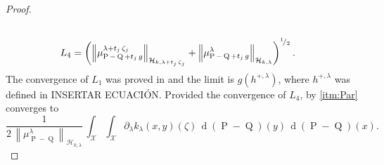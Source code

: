 \begin{proof}
\begin{equation}
\begin{aligned}
					\\
					L_{4}&=\left(\left\|\mu_{\operatorname{P}-\operatorname{Q}+t_{j}\,g}^{\lambda+t_{j}\,\zeta_{j}}\right\|_{\mathcal{H}_{k,\lambda+t_{j}\,\zeta_{j}}}+\left\|\mu_{\operatorname{P}-\operatorname{Q}+t_{j}\,g}^{\lambda}\right\|_{\mathcal{H}_{k,\lambda}}\right)^{^{1}\!/_{2}}.
				\end{aligned}
			\end{equation}
			The convergence of $L_{1}$ was proved in \textcite[Lemma 4]{Carcamo2024} and the limit is $g\left(h^{+,\lambda}\right)$, where $h^{+,\lambda}$ was defined in {\color{orange}INSERTAR ECUACI\'{O}N}. Provided the convergence of $L_{4}$, by \ref{itm:Par} converges to
			\begin{equation}
				\frac{1}{2\,\left\|\mu_{\operatorname{P}-\operatorname{Q}}^{\lambda}\right\|_{\mathcal{H}_{k,\lambda}}}\,\int_{\mathcal{X}}\int_{\mathcal{X}}\partial_{\lambda}k_{\lambda}(x,y)(\zeta)\,\operatorname{d}(\operatorname{P}-\operatorname{Q})(y)\,\operatorname{d}(\operatorname{P}-\operatorname{Q})(x).
			\end{equation}
			

\end{proof}
